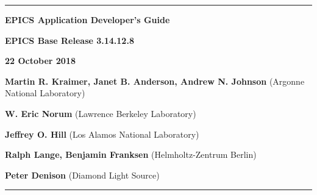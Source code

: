 \hrule

\vspace{1in}

\noindent \Huge \textbf{EPICS Application Developer's Guide}

\vspace{0.5in}

\noindent \Large \textbf{EPICS Base Release 3.14.12.8}

\noindent \textbf{22 October 2018}

\vspace{0.5in}

\normalsize
\noindent \textbf{Martin R. Kraimer, Janet B. Anderson, Andrew N. Johnson} (Argonne National Laboratory)

\noindent \textbf{W. Eric Norum} (Lawrence Berkeley Laboratory)

\noindent \textbf{Jeffrey O. Hill} (Los Alamos National Laboratory)

\noindent \textbf{Ralph Lange, Benjamin Franksen} (Helmholtz-Zentrum Berlin)

\noindent \textbf{Peter Denison} (Diamond Light Source)

\vspace{1in}
\hrule
